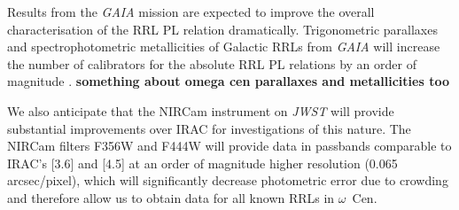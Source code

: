 \documentclass[a4paper,fleqn,usenatbib]{mnras}
\begin{document}
Results from the {\em GAIA} mission \citep{1996A&AS..116..579L} are expected to improve the overall characterisation of the RRL PL relation dramatically. Trigonometric parallaxes and spectrophotometric metallicities of Galactic RRLs from {\em GAIA} will increase the number of calibrators for the absolute RRL PL relations by an order of magnitude \citep[{\bf overview paper}]{2012MNRAS.426.2463L}. {\bf something about omega cen parallaxes and metallicities too}

We also anticipate that the NIRCam instrument on {\em JWST} \citep{2005SPIE.5904...21B, 2006SSRv..123..485G} will provide substantial improvements over IRAC for investigations of this nature. The NIRCam filters F356W and F444W will provide data in passbands comparable to IRAC's [3.6] and [4.5] at an order of magnitude higher resolution (0.065 arcsec/pixel), which will significantly decrease photometric error due to crowding and therefore allow us to obtain data for all known RRLs in $\omega$~Cen. 

\end{document}

